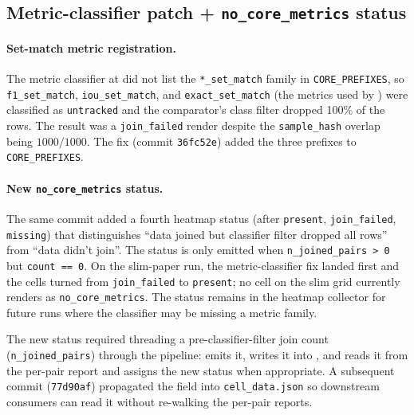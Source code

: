\documentclass[11pt]{article}
\begin{document}
\subsection{\texorpdfstring{Metric-classifier patch + \texttt{no\_core\_metrics} status}{Metric-classifier patch + no\_core\_metrics status}}
\label{sec:tr-tooling-classifier}

\paragraph{Set-match metric registration.}
The metric classifier at  did
  not list the \texttt{*\_set\_match} family in
  \texttt{CORE\_PREFIXES}, so \texttt{f1\_set\_match},
  \texttt{iou\_set\_match}, and \texttt{exact\_set\_match} (the
  metrics used by ) were
  classified as \texttt{untracked} and the comparator's class
  filter dropped 100\% of the rows.
The result was a \texttt{join\_failed} render despite the
  \texttt{sample\_hash} overlap being $1000/1000$.
The fix (commit \texttt{36fc52e}) added the three prefixes to
  \texttt{CORE\_PREFIXES}.

\paragraph{New \texttt{no\_core\_metrics} status.}
The same commit added a fourth heatmap status (after
  \texttt{present}, \texttt{join\_failed}, \texttt{missing}) that
  distinguishes ``data joined but classifier filter dropped all
  rows'' from ``data didn't join''.
The status is only emitted when \texttt{n\_joined\_pairs > 0} but
  \texttt{count == 0}.
On the slim-paper run, the metric-classifier fix landed first and
  the  cells turned from
  \texttt{join\_failed} to \texttt{present}; no cell on the slim grid
  currently renders as \texttt{no\_core\_metrics}.
The status remains in the heatmap collector for future runs where the
  classifier may be missing a metric family.

The new status required threading a pre-classifier-filter join count
  (\texttt{n\_joined\_pairs}) through the pipeline:
   emits it,
   writes it into
  , and
   reads it from
  the per-pair report and assigns the new status when appropriate.
A subsequent commit (\texttt{77d90af}) propagated the field into
  \texttt{cell\_data.json} so downstream consumers can read it
  without re-walking the per-pair reports.
\end{document}
